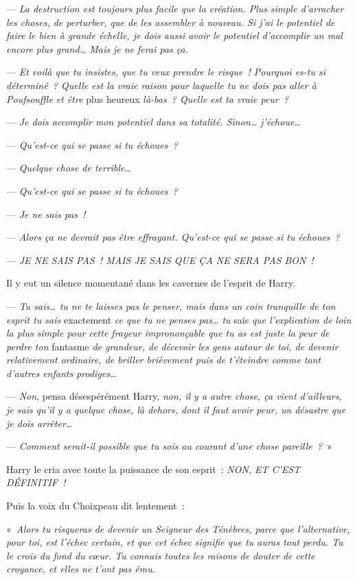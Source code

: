 --- \emph{La destruction est toujours plus facile que la création. Plus simple d'arracher les choses, de perturber, que de les assembler à nouveau. Si j'ai le potentiel de faire le bien à grande échelle, je dois aussi avoir le potentiel d'accomplir un mal encore plus grand… Mais je ne ferai pas ça.}

--- \emph{Et voilà que tu insistes, que tu veux prendre le risque~! Pourquoi es-tu si déterminé~? Quelle est la vraie raison pour laquelle tu ne dois pas aller à Poufsouffle et être} plus heureux \emph{là-bas~? Quelle est ta vraie peur~?}

--- \emph{Je dois accomplir mon potentiel dans sa totalité. Sinon… j'échoue…}

--- \emph{Qu'est-ce qui se passe si tu échoues~?}

--- \emph{Quelque chose de terrible…}

--- \emph{Qu'est-ce qui se passe si tu échoues~?}

--- \emph{Je ne sais pas~!}

--- \emph{Alors ça ne devrait pas être effrayant. Qu'est-ce qui se passe si tu échoues~?}

--- \emph{JE NE SAIS PAS~! MAIS JE SAIS QUE ÇA NE SERA PAS BON~!}

Il y eut un silence momentané dans les cavernes de l'esprit de Harry.

--- \emph{Tu sais… tu ne te laisses pas le penser, mais dans un coin tranquille de ton esprit tu sais} exactement \emph{ce que tu ne penses pas… tu} sais \emph{que l'explication de loin la plus simple pour cette frayeur imprononçable que tu as est juste la peur de perdre ton} fantasme \emph{de grandeur, de décevoir les gens autour de toi, de devenir relativement ordinaire, de briller brièvement puis de t'éteindre comme tant d'autres enfants prodiges…}

--- \emph{Non}, pensa désespérément Harry, \emph{non, il y a autre chose, ça vient d'ailleurs, je sais qu'il y a quelque chose, là dehors, dont il faut avoir peur, un désastre que je dois arrêter…}

--- \emph{Comment serait-il possible que tu sois au courant d'une chose pareille~?}~»

Harry le cria avec toute la puissance de son esprit~: \emph{NON, ET C'EST DÉFINITIF~!}

Puis la voix du Choixpeau dit lentement~:

«~\emph{Alors tu risqueras de devenir un Seigneur des Ténèbres, parce que l'alternative, pour toi, est l'échec certain, et que cet échec signifie que tu auras tout perdu. Tu le crois du fond du cœur. Tu connais toutes les raisons de douter de cette croyance, et elles ne t'ont pas ému.}


